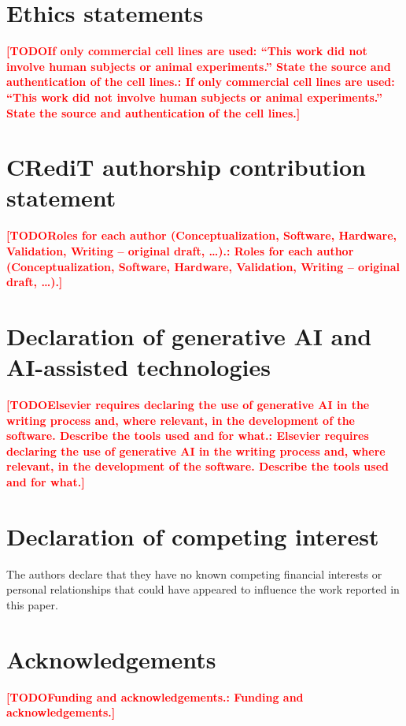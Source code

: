 \documentclass[preprint,12pt]{elsarticle}
\DeclareRobustCommand{\TODO}[1]{\textcolor{red}{\textbf{[TODO\ifx\relax#1\relax\else: #1\fi]}}}
\begin{document}
\section*{Ethics statements}

\TODO{If only commercial cell lines are used: ``This work did not involve
human subjects or animal experiments.'' State the source and authentication
of the cell lines.}

\section*{CRediT authorship contribution statement}

\TODO{Roles for each author (Conceptualization, Software, Hardware,
Validation, Writing -- original draft, \ldots).}

\section*{Declaration of generative AI and AI-assisted technologies}

\TODO{Elsevier requires declaring the use of generative AI in the writing
process and, where relevant, in the development of the software. Describe
the tools used and for what.}

\section*{Declaration of competing interest}

The authors declare that they have no known competing financial interests
or personal relationships that could have appeared to influence the work
reported in this paper.

\section*{Acknowledgements}

\TODO{Funding and acknowledgements.}



\end{document}
